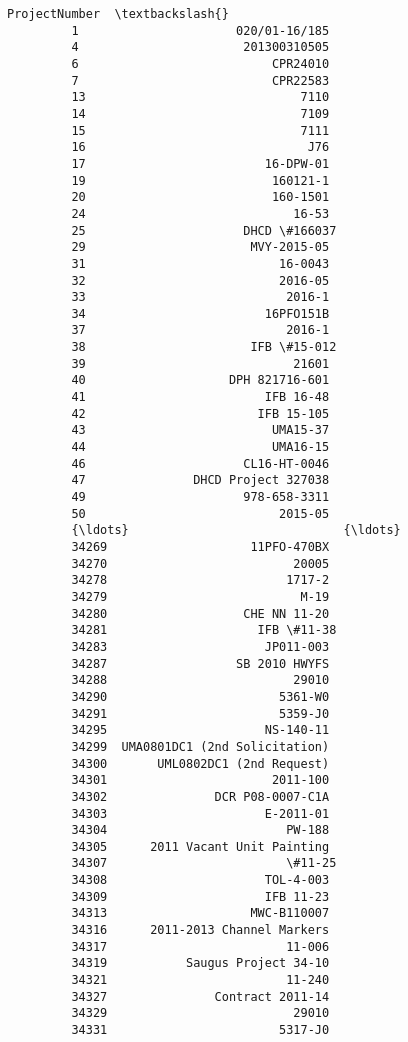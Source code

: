 \documentclass[11pt]{article}
\begin{document}
\begin{Verbatim}[commandchars=\\\{\}]
                                ProjectNumber  \textbackslash{}
         1                      020/01-16/185   
         4                       201300310505   
         6                           CPR24010   
         7                           CPR22583   
         13                              7110   
         14                              7109   
         15                              7111   
         16                               J76   
         17                         16-DPW-01   
         19                          160121-1   
         20                          160-1501   
         24                             16-53   
         25                      DHCD \#166037   
         29                       MVY-2015-05   
         31                           16-0043   
         32                           2016-05   
         33                            2016-1   
         34                         16PFO151B   
         37                            2016-1   
         38                       IFB \#15-012   
         39                             21601   
         40                    DPH 821716-601   
         41                         IFB 16-48   
         42                        IFB 15-105   
         43                          UMA15-37   
         44                          UMA16-15   
         46                      CL16-HT-0046   
         47               DHCD Project 327038   
         49                      978-658-3311   
         50                           2015-05   
         {\ldots}                              {\ldots}   
         34269                    11PFO-470BX   
         34270                          20005   
         34278                         1717-2   
         34279                           M-19   
         34280                   CHE NN 11-20   
         34281                     IFB \#11-38   
         34283                      JP011-003   
         34287                  SB 2010 HWYFS   
         34288                          29010   
         34290                        5361-W0   
         34291                        5359-J0   
         34295                      NS-140-11   
         34299  UMA0801DC1 (2nd Solicitation)   
         34300       UML0802DC1 (2nd Request)   
         34301                       2011-100   
         34302               DCR P08-0007-C1A   
         34303                      E-2011-01   
         34304                         PW-188   
         34305      2011 Vacant Unit Painting   
         34307                         \#11-25   
         34308                      TOL-4-003   
         34309                      IFB 11-23   
         34313                    MWC-B110007   
         34316      2011-2013 Channel Markers   
         34317                         11-006   
         34319           Saugus Project 34-10   
         34321                         11-240   
         34327               Contract 2011-14   
         34329                          29010   
         34331                        5317-J0   
         

\end{Verbatim}
\end{document}
